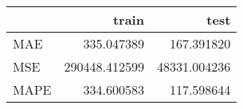 \begin{tabular}{lrr}
\toprule
{} &          train &          test \\
\midrule
MAE  &     335.047389 &    167.391820 \\
MSE  &  290448.412599 &  48331.004236 \\
MAPE &     334.600583 &    117.598644 \\
\bottomrule
\end{tabular}
